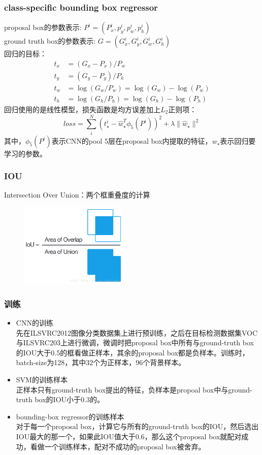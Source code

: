 \documentclass{beamer}
\begin{document}
\begin{frame}
    \frametitle{class-specific bounding box regressor}
    proposal box的参数表示: $P^i=(P_x^i,p_y^i,p_w^i,p_h^i)$ \\
    ground truth box的参数表示: $G=(G_x^i,G_y^i,G_w^i,G_h^i)$ \\
    回归的目标： \\
    $$\begin{aligned} 
        t_x &= (G_x-P_x)/P_w \\
        t_y &= (G_y-P_y)/P_h \\
        t_w &= \log(G_w/P_w)=\log(G_w)-\log(P_w) \\
        t_h &= \log(G_h/P_h)=\log(G_h)-\log(P_h)
    \end{aligned}$$
    \vspace{6pt}
    回归使用的是线性模型，损失函数是均方误差加上$L_2$正则项： 
    $$loss=\sum_i^N (t_{\star}^i-\hat w_{\star}^T \phi_5(P^i))^2+\lambda\|\hat w_{\star}\|^2$$
    \scriptsize{其中，$\phi_5(P^i)$表示CNN的pool 5层在proposal box内提取的特征，$w_{\star}$表示回归要学习的参数。}
\end{frame}

\begin{frame}
    \frametitle{IOU}
    Intersection Over Union：两个框重叠度的计算 \\
    \begin{figure}
        \centering
        \includegraphics[height=4cm]{graphic/iou.png}
    \end{figure}
\end{frame}

\begin{frame}
    \frametitle{训练}
    \begin{itemize}
        \item CNN的训练 \\
        先在ILSVRC2012图像分类数据集上进行预训练，之后在目标检测数据集VOC与ILSVRC203上进行微调，微调时把proposal box中所有与ground-truth box的IOU大于0.5的框看做正样本，其余的proposal box都是负样本。训练时，batch-size为128，其中32个为正样本，96个背景样本。        
        \item SVM的训练样本 \\
        正样本只有ground-truth box提出的特征，负样本是propoal box中与ground-truth box的IOU小于0.3的。
        \item bounding-box regressor的训练样本   \\
        对于每一个proposal box，计算它与所有的ground-truth box的IOU，然后选出IOU最大的那一个，如果此IOU值大于$0.6$，那么这个proposal box就配对成功，看做一个训练样本，配对不成功的proposal box被舍弃。
    \end{itemize}
\end{frame}
\end{document}
